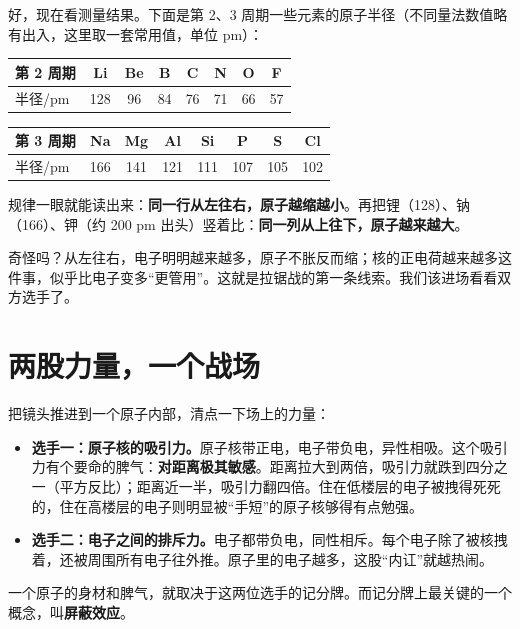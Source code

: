 好，现在看测量结果。下面是第 2、3 周期一些元素的原子半径（不同量法数值略有出入，这里取一套常用值，单位 pm）：

\begin{table}[htbp]
\centering
\begin{tabular}{lccccccc}
\toprule
第 2 周期 & Li & Be & B & C & N & O & F \\
\midrule
半径/pm & 128 & 96 & 84 & 76 & 71 & 66 & 57 \\
\bottomrule
\end{tabular}
\end{table}

\begin{table}[htbp]
\centering
\begin{tabular}{lccccccc}
\toprule
第 3 周期 & Na & Mg & Al & Si & P & S & Cl \\
\midrule
半径/pm & 166 & 141 & 121 & 111 & 107 & 105 & 102 \\
\bottomrule
\end{tabular}
\end{table}

规律一眼就能读出来：\textbf{同一行从左往右，原子越缩越小}。再把锂（128）、钠（166）、钾（约 200 pm 出头）竖着比：\textbf{同一列从上往下，原子越来越大}。

奇怪吗？从左往右，电子明明越来越多，原子不胀反而缩；核的正电荷越来越多这件事，似乎比电子变多“更管用”。这就是拉锯战的第一条线索。我们该进场看看双方选手了。

\section{两股力量，一个战场}

把镜头推进到一个原子内部，清点一下场上的力量：

\begin{itemize}[itemsep=2pt]
\item \textbf{选手一：原子核的吸引力。}原子核带正电，电子带负电，异性相吸。这个吸引力有个要命的脾气：\textbf{对距离极其敏感}。距离拉大到两倍，吸引力就跌到四分之一（平方反比）；距离近一半，吸引力翻四倍。住在低楼层的电子被拽得死死的，住在高楼层的电子则明显被“手短”的原子核够得有点勉强。
\item \textbf{选手二：电子之间的排斥力。}电子都带负电，同性相斥。每个电子除了被核拽着，还被周围所有电子往外推。原子里的电子越多，这股“内讧”就越热闹。
\end{itemize}

一个原子的身材和脾气，就取决于这两位选手的记分牌。而记分牌上最关键的一个概念，叫\textbf{屏蔽效应}。

